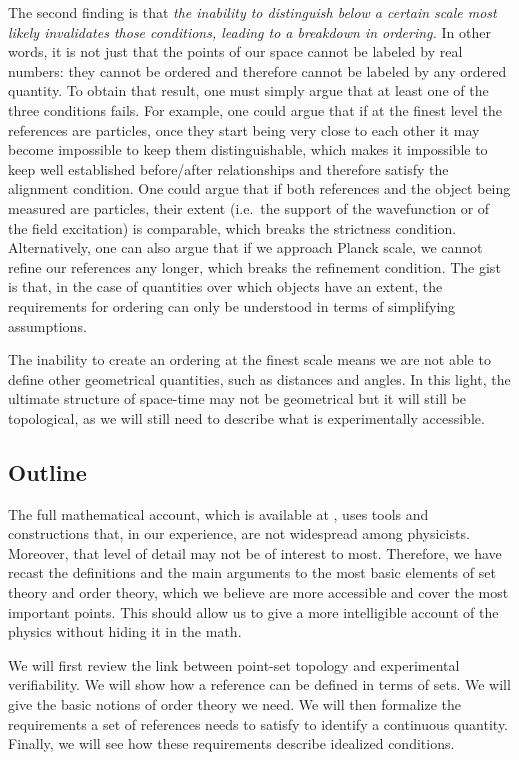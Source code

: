 \documentclass[12pt]{iopart}
\begin{document}
The second finding is that \emph{the inability to distinguish below a certain scale most likely invalidates those conditions, leading to a breakdown in ordering.} In other words, it is not just that the points of our space cannot be labeled by real numbers: they cannot be ordered and therefore cannot be labeled by any ordered quantity. To obtain that result, one must simply argue that at least one of the three conditions fails. For example, one could argue that if at the finest level the references are particles, once they start being very close to each other it may become impossible to keep them distinguishable, which makes it impossible to keep well established before/after relationships and therefore satisfy the alignment condition. One could argue that if both references and the object being measured are particles, their extent (i.e.~the support of the wavefunction or of the field excitation) is comparable, which breaks the strictness condition. Alternatively, one can also argue that if we approach Planck scale, we cannot refine our references any longer, which breaks the refinement condition. The gist is that, in the case of quantities over which objects have an extent, the requirements for ordering can only be understood in terms of simplifying assumptions.

The inability to create an ordering at the finest scale means we are not able to define other geometrical quantities, such as distances and angles. In this light, the ultimate structure of space-time may not be geometrical but it will still be topological, as we will still need to describe what is experimentally accessible.

\subsection{Outline}

The full mathematical account, which is available at \cite{Carc3}, uses tools and constructions that, in our experience, are not widespread among physicists. Moreover, that level of detail may not be of interest to most. Therefore, we have recast the definitions and the main arguments to the most basic elements of set theory and order theory, which we believe are more accessible and cover the most important points. This should allow us to give a more intelligible account of the physics without hiding it in the math.

We will first review the link between point-set topology and experimental verifiability. We will show how a reference can be defined in terms of sets. We will give the basic notions of order theory we need. We will then formalize the requirements a set of references needs to satisfy to identify a continuous quantity. Finally, we will see how these requirements describe idealized conditions.
\end{document}
